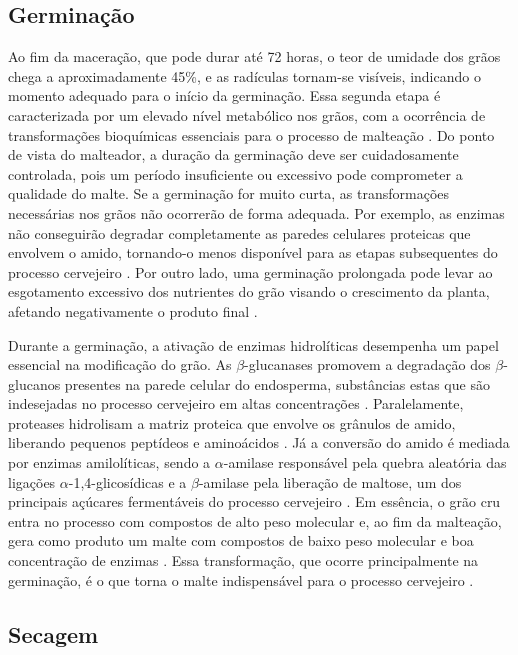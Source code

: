 \subsection{Germinação}

Ao fim da maceração, que pode durar até 72 horas, o teor de umidade dos grãos chega a aproximadamente 45\%, e 
as radículas tornam-se visíveis, indicando o momento adequado para o início da germinação. Essa segunda etapa é 
caracterizada por um elevado nível metabólico nos grãos, com a ocorrência de transformações bioquímicas essenciais 
para o processo de malteação \cite{MALLETT2022}. Do ponto de vista do malteador, a duração da germinação deve ser cuidadosamente 
controlada, pois um período insuficiente ou excessivo pode comprometer a qualidade do malte. Se a germinação for muito curta, 
as transformações necessárias nos grãos não ocorrerão de forma adequada. Por exemplo, as enzimas não conseguirão degradar 
completamente as paredes celulares proteicas que envolvem o amido, tornando-o menos disponível para as etapas subsequentes 
do processo cervejeiro \cite{FOX2009}. Por outro lado, uma germinação prolongada pode levar ao esgotamento excessivo dos nutrientes 
do grão visando o crescimento da planta, afetando negativamente o produto final \cite{LEWIS2012}.

Durante a germinação, a ativação de enzimas hidrolíticas desempenha um papel essencial na modificação do grão.
As $\beta$-glucanases promovem a degradação dos $\beta$-glucanos presentes na parede celular do endosperma, substâncias 
estas que são indesejadas no processo cervejeiro em altas concentrações \cite{LEWIS2012}. Paralelamente, 
proteases hidrolisam a matriz proteica que envolve os grânulos de amido, liberando pequenos peptídeos 
e aminoácidos \cite{FOX2009,GUPTA2010}. Já a conversão do amido é mediada por enzimas amilolíticas,
 sendo a $\alpha$-amilase responsável pela quebra aleatória das ligações $\alpha$-1,4-glicosídicas e a $\beta$-amilase pela 
 liberação de maltose, um dos principais açúcares fermentáveis do processo cervejeiro \cite{GUPTA2010,MALLETT2022}. 
 Em essência, o grão cru entra no processo com compostos de alto peso molecular e, ao fim da malteação, gera como 
 produto um malte com compostos de baixo peso molecular e boa concentração de enzimas \cite{KUNZE1996}. 
 Essa transformação, que ocorre principalmente na germinação, é o que torna o malte indispensável 
 para o processo cervejeiro \cite{CENCI2021}.

\subsection{Secagem}

